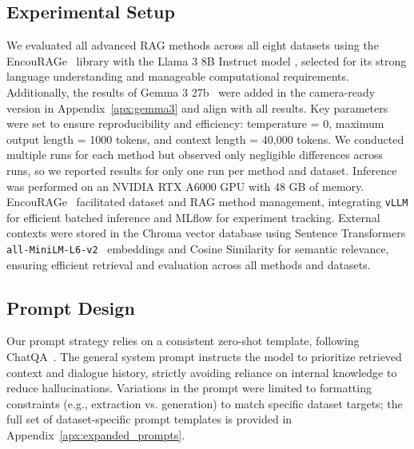 \documentclass[11pt]{article}
\begin{document}
\subsection{Experimental Setup}\label{subsec:setup}
We evaluated all advanced RAG methods across all eight datasets using the EncouRAGe~\cite{strich_encourage_2025} library with the Llama 3 8B Instruct model \cite{grattafiori_llama_2024}, selected for its strong language understanding and manageable computational requirements. Additionally, the results of Gemma 3 27b~\cite{kamath_gemma_2025} were added in the camera-ready version in Appendix~\ref{apx:gemma3} and align with all results.
Key parameters were set to ensure reproducibility and efficiency: temperature = 0, maximum output length = 1000 tokens, and context length = 40,000 tokens. 
We conducted multiple runs for each method but observed only negligible differences across runs, so we reported results for only one run per method and dataset. 
Inference was performed on an NVIDIA RTX A6000 GPU with 48 GB of memory. EncouRAGe~\cite{strich_encourage_2025} facilitated dataset and RAG method management, integrating \texttt{vLLM} \cite{kwon_efficient_2023} for efficient batched inference and MLflow for experiment tracking. External contexts were stored in the Chroma vector database \cite{chromateam_chroma_2025} using Sentence Transformers \texttt{all-MiniLM-L6-v2}~\cite{reimers_making_2020} embeddings and Cosine Similarity for semantic relevance, ensuring efficient retrieval and evaluation across all methods and datasets.




\subsection{Prompt Design} \label{subsec:promptdesign}
Our prompt strategy relies on a consistent zero-shot template, following ChatQA~\cite{liu_chatqa_2024}. The general system prompt instructs the model to prioritize retrieved context and dialogue history, strictly avoiding reliance on internal knowledge to reduce hallucinations. Variations in the prompt were limited to formatting constraints (e.g., extraction vs. generation) to match specific dataset targets; the full set of dataset-specific prompt templates is provided in Appendix~\ref{apx:expanded_prompts}.
\end{document}
